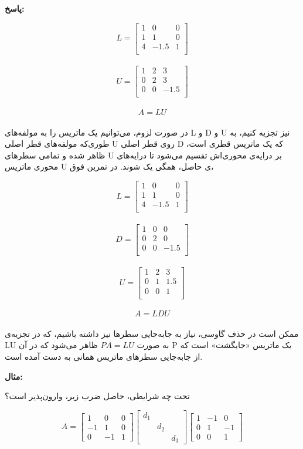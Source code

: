 \textbf{پاسخ:}

$$L = \begin{bmatrix}1& 0 & 0\\ 1 & 1 & 0 \\4 & -1.5 & 1\\\end{bmatrix}$$ \\
$$U = \begin{bmatrix}1& 2 & 3\\ 0 & 2 & 3 \\0 & 0 & -1.5\\\end{bmatrix}$$ \\
$$ A = LU $$ \\

در صورت لزوم، می‌توانیم یک ماتریس را به مولفه‌های L و D و U نیز تجزیه کنیم، به طوری‌که مولفه‌های قطر اصلی U روی قطر اصلی D که یک ماتریس قطری است، ظاهر شده و تمامی سطرهای U بر درایه‌ی محوری‌اش تقسیم می‌شود تا درایه‌های محوری ماتریس U ی حاصل، همگی یک شوند. در تمرین فوق،

$$L = \begin{bmatrix}1& 0 & 0\\ 1 & 1 & 0 \\4 & -1.5 & 1\\\end{bmatrix}$$ \\
$$D = \begin{bmatrix}1& 0 & 0\\ 0 & 2 & 0 \\0 & 0 & -1.5\\\end{bmatrix}$$ \\
$$U = \begin{bmatrix}1& 2 & 3\\ 0 & 1 & 1.5 \\0 & 0 & 1\\\end{bmatrix}$$ \\
$$ A = LDU $$ \\

ممکن است در حذف گاوسی، نیاز به جابه‌جایی سطرها نیز داشته باشیم، که در تجزیه‌ی LU به صورت $PA = LU$ ظاهر می‌شود که در آن P یک ماتریس «جایگشت» است که از جابه‌جایی سطرهای ماتریس همانی به دست آمده است.

\textbf{مثال:}

تحت چه شرایطی، حاصل ضرب زیر، وارون‌پذیر است؟

\[
A= \begin{bmatrix}
1 & 0& 0\\
-1& 1 & 0\\
0& -1 & 1
\end{bmatrix}
\begin{bmatrix}
d_1 & & \\
& d_2 & \\
&  & d_3
\end{bmatrix}
\begin{bmatrix}
1 & -1& 0\\
0& 1 & -1\\
0& 0 & 1
\end{bmatrix}
\]

